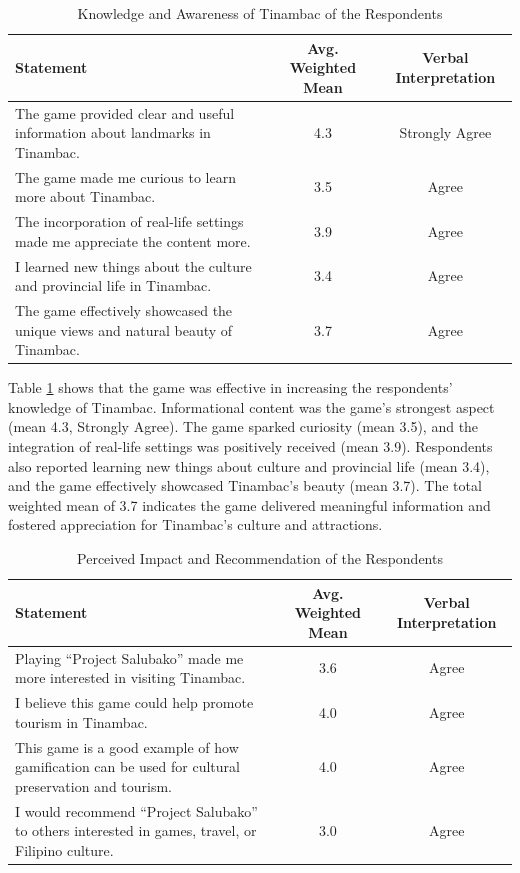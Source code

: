 \documentclass{research}
\begin{document}
\begin{table}[h!]
\centering
\caption{Knowledge and Awareness of Tinambac of the Respondents}
\label{tab:knowledge_awareness}
\begin{tabularx}{\textwidth}{Xcc}
\toprule
\textbf{Statement} & \textbf{Avg. Weighted Mean} & \textbf{Verbal Interpretation} \\
\midrule
The game provided clear and useful information about landmarks in Tinambac. & 4.3 & Strongly Agree \\[0.3em]
The game made me curious to learn more about Tinambac. & 3.5 & Agree \\[0.3em]
The incorporation of real-life settings made me appreciate the content more. & 3.9 & Agree \\[0.3em]
I learned new things about the culture and provincial life in Tinambac. & 3.4 & Agree \\[0.3em]
The game effectively showcased the unique views and natural beauty of Tinambac. & 3.7 & Agree \\
\bottomrule
\end{tabularx}
\end{table}

Table \ref{tab:knowledge_awareness} shows that the game was effective in increasing
the respondents' knowledge of Tinambac. Informational content was the game's strongest
aspect (mean 4.3, Strongly Agree). The game sparked curiosity (mean 3.5), and the
integration of real-life settings was positively received (mean 3.9). Respondents also
reported learning new things about culture and provincial life (mean 3.4), and the game
effectively showcased Tinambac's beauty (mean 3.7). The total weighted mean of 3.7
indicates the game delivered meaningful information and fostered appreciation for
Tinambac's culture and attractions.



\begin{table}[h!]
\centering
\caption{Perceived Impact and Recommendation of the Respondents}
\label{tab:perceived_impact}
\begin{tabularx}{\textwidth}{Xcc}
\toprule
\textbf{Statement} & \textbf{Avg. Weighted Mean} & \textbf{Verbal Interpretation} \\
\midrule
Playing ``Project Salubako'' made me more interested in visiting Tinambac. & 3.6 & Agree \\[0.3em]
I believe this game could help promote tourism in Tinambac. & 4.0 & Agree \\[0.3em]
This game is a good example of how gamification can be used for cultural preservation and tourism. & 4.0 & Agree \\[0.3em]
I would recommend ``Project Salubako'' to others interested in games, travel, or Filipino culture. & 3.0 & Agree \\
\bottomrule
\end{tabularx}
\end{table}
\end{document}
